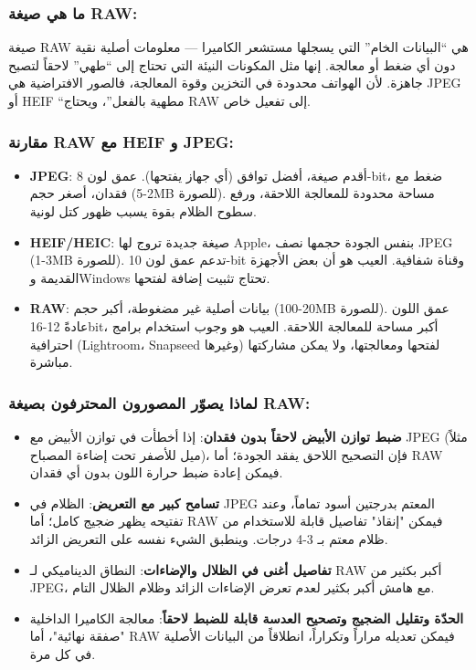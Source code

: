 
\subsubsection*{ما هي صيغة RAW:}

صيغة RAW هي “البيانات الخام” التي يسجلها مستشعر الكاميرا — معلومات أصلية نقية دون أي ضغط أو معالجة. إنها مثل المكونات النيئة التي تحتاج إلى “طهي” لاحقاً لتصبح جاهزة. لأن الهواتف محدودة في التخزين وقوة المعالجة، فالصور الافتراضية هي JPEG أو HEIF “مطهية بالفعل”، ويحتاج RAW إلى تفعيل خاص.

\subsubsection*{مقارنة RAW مع HEIF و JPEG:}

\begin{itemize}
  \item \textbf{JPEG}: أقدم صيغة، أفضل توافق (أي جهاز يفتحها). عمق لون 8-bit، ضغط مع فقدان، أصغر حجم (2-5MB للصورة). مساحة محدودة للمعالجة اللاحقة، ورفع سطوح الظلام بقوة يسبب ظهور كتل لونية.
  \item \textbf{HEIF/HEIC}: صيغة جديدة تروج لها Apple، بنفس الجودة حجمها نصف JPEG (1-3MB للصورة). تدعم عمق لون 10-bit وقناة شفافية. العيب هو أن بعض الأجهزة القديمة وWindows تحتاج تثبيت إضافة لفتحها.
  \item \textbf{RAW}: بيانات أصلية غير مضغوطة، أكبر حجم (20-100MB للصورة). عمق اللون عادةً 12-16bit، أكبر مساحة للمعالجة اللاحقة. العيب هو وجوب استخدام برامج احترافية (Lightroom، Snapseed وغيرها) لفتحها ومعالجتها، ولا يمكن مشاركتها مباشرة.
\end{itemize}

\subsubsection*{لماذا يصوّر المصورون المحترفون بصيغة RAW:}

\begin{itemize}
  \item \textbf{ضبط توازن الأبيض لاحقاً بدون فقدان}: إذا أخطأت في توازن الأبيض مع JPEG (مثلاً ميل للأصفر تحت إضاءة المصباح)، فإن التصحيح اللاحق يفقد الجودة؛ أما RAW فيمكن إعادة ضبط حرارة اللون بدون أي فقدان.
  \item \textbf{تسامح كبير مع التعريض}: الظلام في JPEG المعتم بدرجتين أسود تماماً، وعند تفتيحه يظهر ضجيج كامل؛ أما RAW فيمكن "إنقاذ" تفاصيل قابلة للاستخدام من ظلام معتم بـ 3-4 درجات. وينطبق الشيء نفسه على التعريض الزائد.
  \item \textbf{تفاصيل أغنى في الظلال والإضاءات}: النطاق الديناميكي لـ RAW أكبر بكثير من JPEG، مع هامش أكبر بكثير لعدم تعرض الإضاءات الزائد وظلام الظلال التام.
  \item \textbf{الحدّة وتقليل الضجيج وتصحيح العدسة قابلة للضبط لاحقاً}: معالجة الكاميرا الداخلية "صفقة نهائية"، أما RAW فيمكن تعديله مراراً وتكراراً، انطلاقاً من البيانات الأصلية في كل مرة.
\end{itemize}

